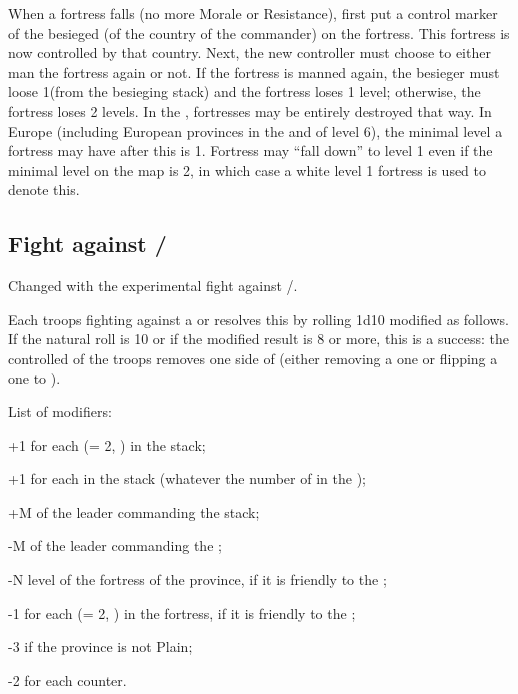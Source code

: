 When a fortress falls (no more Morale or Resistance), first put a control
marker of the besieged (of the country of the commander) on the fortress. This
fortress is now controlled by that country. Next, the new controller must
choose to either man the fortress again or not. If the fortress is manned
again, the besieger must loose 1\LD (from the besieging stack) and the
fortress loses 1 level; otherwise, the fortress loses 2 levels. In the \ROTW,
fortresses may be entirely destroyed that way. In Europe (including European
provinces in the \ROTW and \COL of level 6), the minimal level a fortress may
have after this is 1. Fortress may ``fall down'' to level 1 even if the
minimal level on the map is 2, in which case a white level 1 fortress is used
to denote this.

\subsection{Fight against \REVOLT/\REBELLION}
\begin{designnote}
  Changed with the experimental fight against \RevReb/\corsaire.
\end{designnote}

Each troops fighting against a \REVOLT or \REBELLION resolves this by rolling
1d10 modified as follows. If the natural roll is 10 or if the modified result
is 8 or more, this is a success: the controlled of the troops removes one side
of \RevReb (either removing a \Facemoins one or flipping a \Faceplus one to
\Facemoins).

List of modifiers:
\begin{modlist}
\item[+1] for each \LD (\ARMY\facemoins = 2\LD, \ARMY{}\LD) in the
  stack;
\item[+1] for each \Pasha in the stack (whatever the number of \LD in the
  \Pasha);
\item[+M] \Man of the leader commanding the stack;
\item[-M] \Man of the leader commanding the \RevReb;
\item[-N] level of the fortress of the province, if it is friendly to the
  \RevReb;
\item[-1] for each \LD (\ARMY\facemoins = 2\LD, \ARMY{}\LD) in the
  fortress, if it is friendly to the \RevReb;
\item[-3] if the province is not Plain;
\item[-2] for each \RevReb\faceplus counter.
\end{modlist}

